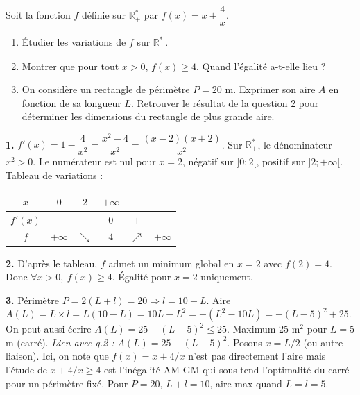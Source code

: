 \documentclass[11pt]{article}
\begin{document}
\begin{exercice}
Soit la fonction $f$ définie sur $\mathbb{R}^*_+$ par $f(x) = x + \dfrac{4}{x}$.
\begin{enumerate}
\item Étudier les variations de $f$ sur $\mathbb{R}^*_+$.
\item Montrer que pour tout $x > 0$, $f(x) \geq 4$. Quand l'égalité a-t-elle lieu ?
\item On considère un rectangle de périmètre $P = 20$ m. Exprimer son aire $A$ en fonction de sa longueur $L$. Retrouver le résultat de la question 2 pour déterminer les dimensions du rectangle de plus grande aire.
\end{enumerate}
\end{exercice}

\begin{corrige}
\textbf{1.} $f'(x) = 1 - \dfrac{4}{x^2} = \dfrac{x^2-4}{x^2} = \dfrac{(x-2)(x+2)}{x^2}$.
Sur $\mathbb{R}^*_+$, le dénominateur $x^2 > 0$. Le numérateur est nul pour $x=2$, négatif sur $]0;2[$, positif sur $]2;+\infty[$.
Tableau de variations :
\begin{center}
\begin{tabular}{|c|ccccc|}\hline
$x$ & $0$ & $2$ & $+\infty$ \\ \hline
$f'(x)$ & & $-$ & $0$ & $+$ \\ \hline
$f$ & $+\infty$ & $\searrow$ & $4$ & $\nearrow$ & $+\infty$ \\ \hline
\end{tabular}
\end{center}

\textbf{2.} D'après le tableau, $f$ admet un minimum global en $x=2$ avec $f(2)=4$. Donc $\forall x>0,\ f(x) \geq 4$. Égalité pour $x=2$ uniquement.

\textbf{3.} Périmètre $P = 2(L+l) = 20 \Rightarrow l = 10 - L$.
Aire $A(L) = L \times l = L(10-L) = 10L - L^2 = -(L^2 - 10L) = -(L-5)^2 + 25$.
On peut aussi écrire $A(L) = 25 - (L-5)^2 \leq 25$. Maximum $25$ m$^2$ pour $L=5$ m (carré).
\emph{Lien avec q.2 :} $A(L) = 25 - (L-5)^2$. Posons $x = L/2$ (ou autre liaison). Ici, on note que $f(x)=x+4/x$ n'est pas directement l'aire mais l'étude de $x+4/x \geq 4$ est l'inégalité AM-GM qui sous-tend l'optimalité du carré pour un périmètre fixé. Pour $P=20$, $L+l=10$, aire max quand $L=l=5$.
\end{corrige}
\end{document}

